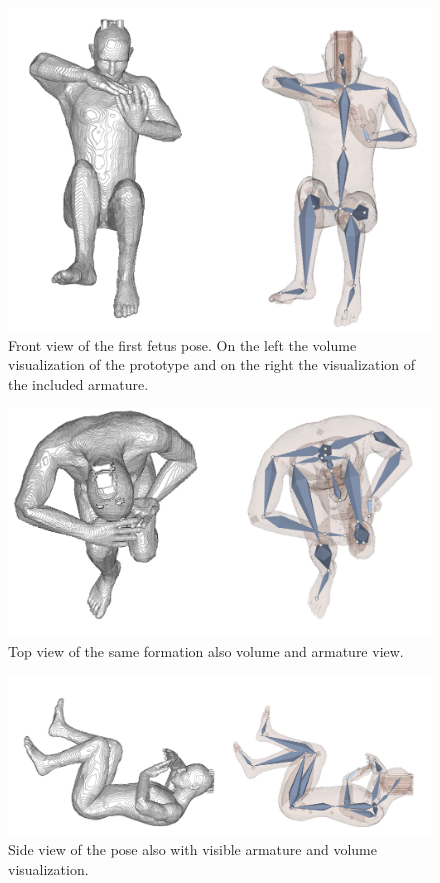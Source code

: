 \begin{figure} [htb!]
    \centering
	\includegraphics[width=13cm]{content/images/results/man1Front.png}
	\caption{Front view of the first fetus pose. On the left the volume visualization of the prototype and on the right the visualization of the included armature.}
	\label{fig:}
\end{figure}
\begin{figure} [htb!]
    \centering
	\includegraphics[width=13cm]{content/images/results/man1Top.png}
	\caption{Top view of the same formation also volume and armature view.}
	\label{fig:}
\end{figure}

\begin{figure} [htb!]
    \centering
	\includegraphics[width=15cm]{content/images/results/man1Side.png}
	\caption{Side view of the pose also with visible armature and volume visualization.}
	\label{fig:}
\end{figure}

